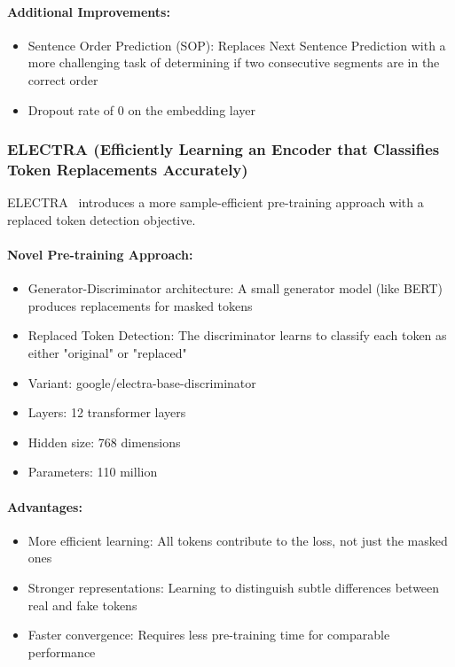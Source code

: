 \documentclass[12pt]{article}
\begin{document}
\paragraph{Additional Improvements:}
\begin{itemize}
    \item Sentence Order Prediction (SOP): Replaces Next Sentence Prediction with a more challenging task of determining if two consecutive segments are in the correct order
    \item Dropout rate of 0 on the embedding layer
\end{itemize}

\subsubsection{ELECTRA (Efficiently Learning an Encoder that Classifies Token Replacements Accurately)}
ELECTRA~\cite{clark2020electra} introduces a more sample-efficient pre-training approach with a replaced token detection objective.

\paragraph{Novel Pre-training Approach:}
\begin{itemize}
    \item Generator-Discriminator architecture: A small generator model (like BERT) produces replacements for masked tokens
    \item Replaced Token Detection: The discriminator learns to classify each token as either "original" or "replaced"
    \item Variant: google/electra-base-discriminator
    \item Layers: 12 transformer layers
    \item Hidden size: 768 dimensions
    \item Parameters: 110 million
\end{itemize}

\paragraph{Advantages:}
\begin{itemize}
    \item More efficient learning: All tokens contribute to the loss, not just the masked ones
    \item Stronger representations: Learning to distinguish subtle differences between real and fake tokens
    \item Faster convergence: Requires less pre-training time for comparable performance
\end{itemize}
\end{document}
